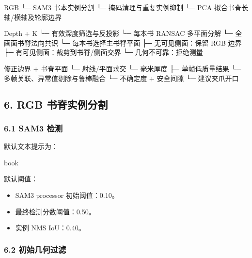 \documentclass[
  chinese,
  11pt,
  a4paper,
]{article}
\newenvironment{Shaded}{\begin{snugshade}}{\end{snugshade}}
\newcommand{\NormalTok}[1]{#1}
\providecommand{\tightlist}{%
  \setlength{\itemsep}{0pt}\setlength{\parskip}{0pt}}
\begin{document}
\begin{Shaded}
\begin{Highlighting}[]
\NormalTok{RGB}
\NormalTok{ └─ SAM3 书本实例分割}
\NormalTok{     └─ 掩码清理与重复实例抑制}
\NormalTok{         └─ PCA 拟合书脊长轴/横轴及轮廓边界}

\NormalTok{Depth + K}
\NormalTok{ └─ 有效深度筛选与反投影}
\NormalTok{     └─ 每本书 RANSAC 多平面分解}
\NormalTok{         └─ 全画面书脊法向共识}
\NormalTok{             └─ 每本书选择主书脊平面}
\NormalTok{                 ├─ 无可见侧面：保留 RGB 边界}
\NormalTok{                 ├─ 有可见侧面：裁剪到书脊/侧面交界}
\NormalTok{                 └─ 几何不可靠：拒绝测量}

\NormalTok{修正边界 + 书脊平面}
\NormalTok{ └─ 射线/平面求交}
\NormalTok{     └─ 毫米厚度}
\NormalTok{         ├─ 单帧低质量结果}
\NormalTok{         └─ 多帧关联、异常值剔除与鲁棒融合}
\NormalTok{             └─ 不确定度 + 安全间隙}
\NormalTok{                 └─ 建议夹爪开口}
\end{Highlighting}
\end{Shaded}

\subsection{6. RGB
书脊实例分割}\label{6-rgb-ux4e66ux810aux5b9eux4f8bux5206ux5272}

\subsubsection{6.1 SAM3 检测}\label{61-sam3-ux68c0ux6d4b}

默认文本提示为：

\begin{Shaded}
\begin{Highlighting}[]
\NormalTok{book}
\end{Highlighting}
\end{Shaded}

默认阈值：

\begin{itemize}
\tightlist
\item
  SAM3 processor 初始阈值：0.10。
\item
  最终检测分数阈值：0.50。
\item
  实例 NMS IoU：0.40。
\end{itemize}

\subsubsection{6.2
初始几何过滤}\label{62-ux521dux59cbux51e0ux4f55ux8fc7ux6ee4}
\end{document}
